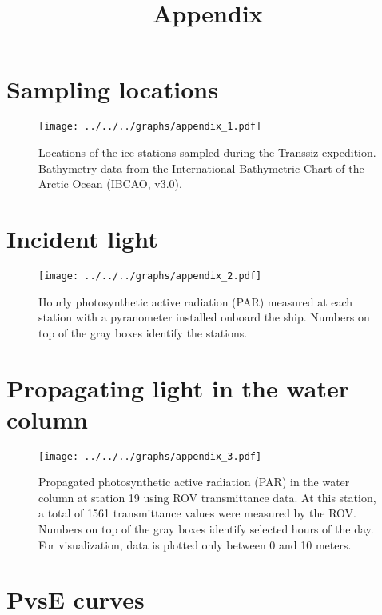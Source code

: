 \documentclass[12pt,a4paper]{scrartcl}
\title{Appendix}
\date{}
\begin{document}
\maketitle

\section*{Sampling locations}

\begin{figure}[h]
	\centering
	\texttt{[image: ../../../graphs/appendix\_1.pdf]}
	\caption{Locations of the ice stations sampled during the Transsiz expedition. Bathymetry data from the International Bathymetric Chart of the Arctic Ocean (IBCAO, v3.0).}
\end{figure}

\clearpage
\newpage

\section*{Incident light}

\begin{figure}[h]
	\centering
	\texttt{[image: ../../../graphs/appendix\_2.pdf]}
	\caption{Hourly photosynthetic active radiation (PAR) measured at each station with a pyranometer installed onboard the ship. Numbers on top of the gray boxes identify the stations.}
\end{figure}

\clearpage
\newpage

\section*{Propagating light in the water column}

\begin{figure}[h]
	\centering
	\texttt{[image: ../../../graphs/appendix\_3.pdf]}
	\caption{Propagated photosynthetic active radiation (PAR) in the water column at station 19 using ROV transmittance data. At this station, a total of 1561 transmittance values were measured by the ROV. Numbers on top of the gray boxes identify selected hours of the day. For visualization, data is plotted only between 0 and 10 meters.}
\end{figure}

\clearpage
\newpage

\section*{PvsE curves}
\end{document}
